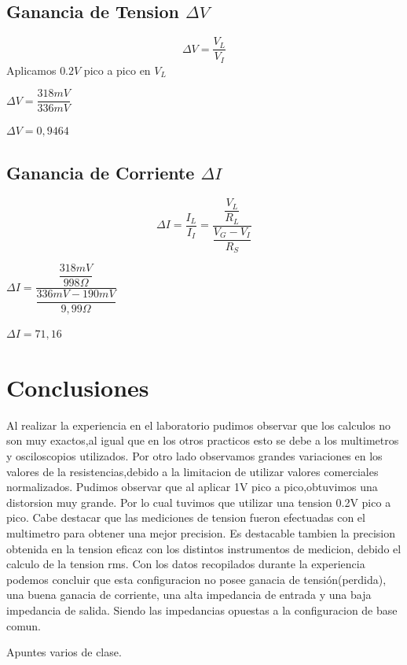 \documentclass[12pt]{article}
\begin{document}
\subsection{Ganancia de Tension $\Delta V$}
\begin{equation}
 \Delta V=\frac{V_L}{V_I}
\end{equation}
\vspace{0.2cm}
Aplicamos $0.2V$ pico a pico en $V_L$
\begin{center}
 $\Delta V=\dfrac{318mV}{336mV}$
 
 $\Delta V=0,9464$
\end{center}

\subsection{Ganancia de Corriente $\Delta I$}
\begin{equation}
  \Delta I=\frac{I_L}{I_I}=\dfrac{\dfrac{V_L}{R_L}}{\dfrac{V_G-V_I}{R_S}}
\end{equation}
\vspace{0.2cm}
\begin{center}
$\Delta I=\dfrac{\dfrac{318mV}{998\Omega}}{\dfrac{336mV-190mV}{9,99\Omega}}$

$\Delta I=71,16$
\end{center}


\section{Conclusiones}
Al realizar la experiencia en el laboratorio pudimos observar que los calculos no son muy exactos,al igual que en los otros practicos esto se debe a los multimetros y osciloscopios utilizados. Por otro lado observamos grandes variaciones en los valores de la resistencias,debido a la limitacion de utilizar valores comerciales normalizados.
Pudimos observar que al aplicar 1V pico a pico,obtuvimos una distorsion muy grande. Por lo cual tuvimos que utilizar una tension 0.2V pico a pico.
Cabe destacar que las mediciones de tension fueron efectuadas con el multimetro para obtener una mejor precision. Es destacable tambien la precision obtenida en la tension eficaz con los distintos instrumentos de medicion, debido el calculo de la tension rms.
Con los datos recopilados durante la experiencia podemos concluir que esta configuracion no posee ganacia de tensión(perdida), una buena ganacia de corriente, una alta impedancia de entrada y una baja impedancia de salida.
Siendo las impedancias opuestas a la configuracion de base comun.


Apuntes varios de clase.
\end{document}
